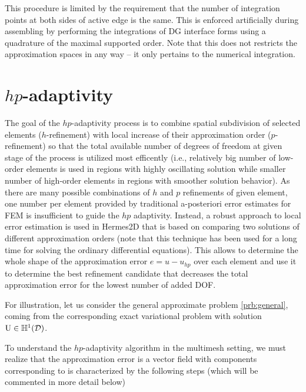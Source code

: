 This procedure is limited by the requirement that the number of integration points at both sides of
active edge is the same. This is enforced artificially during assembling by performing the integrations of DG interface
forms using a quadrature of the maximal supported order. Note that this does not restricts the approximation spaces
in any way -- it only pertains to the numerical integration.

\section{$hp$-adaptivity}\label{sec:hermes_adapt}
The goal of the $hp$-adaptivity process is to combine spatial subdivision of selected elements ($h$-refinement) with
local increase of their approximation order ($p$-refinement) so that the total available number of degrees of freedom at given stage of
the process is utilized most efficently (i.e., relatively big number of low-order elements is used in regions with highly oscillating solution
while smaller number of high-order elements in regions with smoother solution behavior). As there are many
possible combinations of $h$ and $p$ refinements of given element, one number per element provided by traditional
a-posteriori error estimates for FEM is insufficient to guide the $hp$ adaptivity. Instead, a robust
approach to local error estimation is used in Hermes2D that is based on comparing two
solutions of different approximation orders (note that this technique has been used for a long time for solving the
ordinary differential equations). This allows to determine the whole shape of the approximation error $e = u - u_{hp}$ 
over each element and use it to determine the best refinement candidate that decreases the total approximation error for
the lowest number of added DOF. 

For illustration, let us consider the general approximate problem \ref{prb:general}, coming from the corresponding
exact variational problem with solution $\mathrm{U}\in\mathbb{H}^1(\mathcal{D})$.

To understand the $hp$-adaptivity algorithm in the multimesh setting, we must realize that the approximation error is a
vector field with components corresponding to  is characterized by the following steps (which will be commented in more
detail below)

